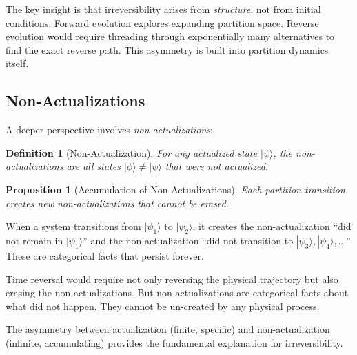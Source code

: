 \documentclass[twocolumn,10pt,aps,prd,superscriptaddress,nofootinbib]{revtex4-2}
\newtheorem{proposition}[theorem]{Proposition}
\newtheorem{definition}[theorem]{Definition}
\theoremstyle{remark}
\begin{document}
The key insight is that irreversibility arises from \emph{structure}, not from initial conditions. Forward evolution explores expanding partition space. Reverse evolution would require threading through exponentially many alternatives to find the exact reverse path. This asymmetry is built into partition dynamics itself.

\subsection{Non-Actualizations}

A deeper perspective involves \emph{non-actualizations}:

\begin{definition}[Non-Actualization]
\label{def:non_actualization}
For any actualized state $|\psi\rangle$, the non-actualizations are all states $|\phi\rangle \neq |\psi\rangle$ that were not actualized.
\end{definition}

\begin{proposition}[Accumulation of Non-Actualizations]
\label{prop:non_actualizations}
Each partition transition creates new non-actualizations that cannot be erased.
\end{proposition}

When a system transitions from $|\psi_1\rangle$ to $|\psi_2\rangle$, it creates the non-actualization ``did not remain in $|\psi_1\rangle$'' and the non-actualization ``did not transition to $|\psi_3\rangle, |\psi_4\rangle, \ldots$'' These are categorical facts that persist forever.

Time reversal would require not only reversing the physical trajectory but also erasing the non-actualizations. But non-actualizations are categorical facts about what did not happen. They cannot be un-created by any physical process.

The asymmetry between actualization (finite, specific) and non-actualization (infinite, accumulating) provides the fundamental explanation for irreversibility.
\end{document}
